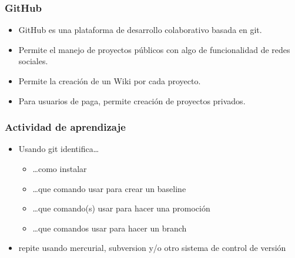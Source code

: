 \begin{frame}
	\frametitle{GitHub}
	\begin{itemize}
	\item GitHub es una plataforma de desarrollo colaborativo basada en git. 
	\item Permite el manejo de proyectos p\'ublicos con algo de funcionalidad de redes sociales. 
	\item Permite la creaci\'on de un Wiki por cada proyecto. 
	\item Para usuarios de paga, permite creaci\'on de proyectos privados. 
	\end{itemize}
\end{frame}

\begin{frame}
	\frametitle{Actividad de aprendizaje}
	\begin{itemize}
		\item{Usando git identifica\ldots}
			\begin{itemize}
				\item \ldots como instalar 
				\item \ldots que comando usar para crear un baseline
				\item \ldots que comando(s) usar para hacer una promoci\'on
				\item \ldots que comandos usar para hacer un branch
			\end{itemize}
		\item{repite usando mercurial, subversion y/o otro sistema de control de versi\'on}
	\end{itemize}
\end{frame}

